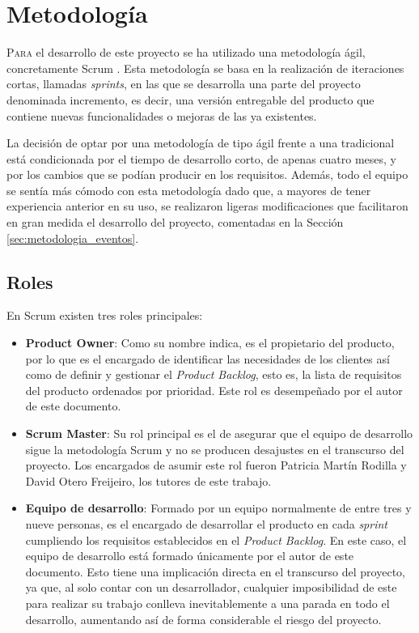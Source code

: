 \chapter{Metodología}
\label{chap:metodologia}

\lettrine{P}{ara} el desarrollo de este proyecto se ha utilizado una metodología ágil, concretamente Scrum \cite{scrum}.
Esta metodología se basa en la realización de iteraciones cortas, llamadas \textit{sprints}, en las que se desarrolla una parte del proyecto
denominada incremento, es decir, una versión entregable del producto que contiene
nuevas funcionalidades o mejoras de las ya existentes.

\bigskip
La decisión de optar por una metodología de tipo ágil frente a una tradicional
está condicionada por el tiempo de desarrollo corto, de apenas cuatro meses, y por los cambios que se podían producir en los requisitos.
Además, todo el equipo se sentía más cómodo con esta metodología dado que, a mayores de tener experiencia anterior en su uso, se realizaron
ligeras modificaciones que facilitaron en gran medida el desarrollo del proyecto, comentadas en la Sección \ref{sec:metodologia_eventos}.

\section{Roles}
\label{sec:metodologia_roles}

En Scrum existen tres roles principales:

\begin{itemize}
	\item \textbf{Product Owner}: Como su nombre indica, es el propietario del producto, por lo que es el encargado de identificar
	      las necesidades de los clientes así como de definir y gestionar el \textit{Product Backlog}, esto es, la lista de requisitos del producto ordenados por prioridad.
	      Este rol es desempeñado por el autor de este documento.
	\item \textbf{Scrum Master}: Su rol principal es el de asegurar que el equipo de desarrollo sigue la metodología Scrum y no se producen
	      desajustes en el transcurso del proyecto. Los encargados de asumir este rol fueron Patricia Martín Rodilla y David Otero Freijeiro, los
	      tutores de este trabajo.
	\item \textbf{Equipo de desarrollo}: Formado por un equipo normalmente de entre tres y nueve personas, es el encargado de desarrollar el producto
	      en cada \textit{sprint} cumpliendo los requisitos establecidos en el \textit{Product Backlog}. En este caso, el equipo de desarrollo está
	      formado únicamente por el autor de este documento. Esto tiene una implicación directa en el transcurso del proyecto, ya que,
	      al solo contar con un desarrollador, cualquier imposibilidad de este para realizar su trabajo conlleva inevitablemente a una parada en todo el desarrollo,
	      aumentando así de forma considerable el riesgo del proyecto.
\end{itemize}

